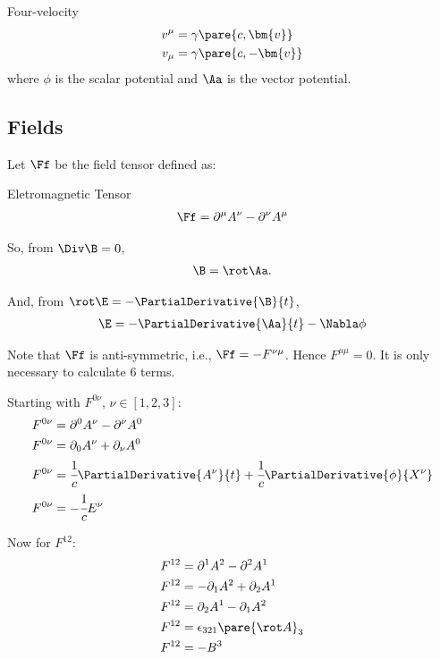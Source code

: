 \begin{definition}{Four-velocity}
  \begin{align}
    v^\mu &= \gamma\pare{c, \bm{v}} \\
    v_\mu &= \gamma\pare{c, -\bm{v}}
  \end{align}
  where $\phi$ is the scalar potential and $\Aa$ is the vector potential.
\end{definition}

\subsection{Fields}
  \label{sub:fields}
  Let $\Ff$ be the field tensor defined as:
  \begin{definition}{Eletromagnetic Tensor}
    \begin{align}
      \Ff = \partial^\mu A^\nu - \partial^\nu A^\mu
    \end{align}
  \end{definition}

  So, from $\Div \B = 0$,
  \begin{align}
    \B = \rot \Aa.
  \end{align}

  And, from $\rot \E = -\PartialDerivative{\B}{t}$,
  \begin{align}
    \E = -\PartialDerivative{\Aa}{t} - \Nabla \phi
  \end{align}

  Note that $\Ff$ is anti-symmetric, i.e., $\Ff = -F^{\nu\mu}$. Hence $F^{\mu\mu} = 0$. It is only necessary to calculate 6 terms.

  Starting with $F^{0\nu}$, $\nu \in [1,2,3]$:
  \begin{align}
    F^{0\nu} &= \partial^0 A^\nu - \partial^\nu A^0 \\
    F^{0\nu} &= \partial_0 A^\nu + \partial_\nu A^0 \\
    F^{0\nu} &= \cfrac{1}{c}\PartialDerivative{A^\nu}{t} + \cfrac{1}{c}\PartialDerivative{\phi}{X^\nu}\\
    F^{0\nu} &= -\cfrac{1}{c}E^\nu
  \end{align}

  Now for $F^{12}$:
  \begin{align}
    F^{12} &= \partial^1 A^2 - \partial^2 A^1 \\
    F^{12} &= -\partial_1 A^2 + \partial_2 A^1 \\
    F^{12} &= \partial_2 A^1 -\partial_1 A^2 \\
    F^{12} &= \epsilon_{321}\pare{\rot A}_3 \\
    F^{12} &= -B^3
  \end{align}

